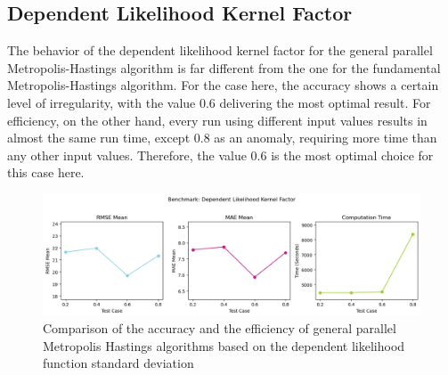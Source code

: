 \subsection{Dependent Likelihood Kernel Factor}
The behavior of the dependent likelihood kernel factor for the general parallel Metropolis-Hastings algorithm is far different from the one for the fundamental Metropolis-Hastings algorithm. For the case here, the accuracy shows a certain level of irregularity, with the value $0.6$ delivering the most optimal result. For efficiency, on the other hand, every run using different input values results in almost the same run time, except $0.8$ as an anomaly, requiring more time than any other input values. Therefore, the value $0.6$ is the most optimal choice for this case here.

\begin{figure}[H]
    \centering
    \includegraphics[width=1\textwidth]{figures/gpmh/dependent_likelihood_kernel_factor.png}
    \captionsetup{width=.8\textwidth}
    \caption{Comparison of the accuracy and the efficiency of general parallel Metropolis Hastings algorithms based on the dependent likelihood function standard deviation}
    \label{fig:enter-label}
\end{figure}



